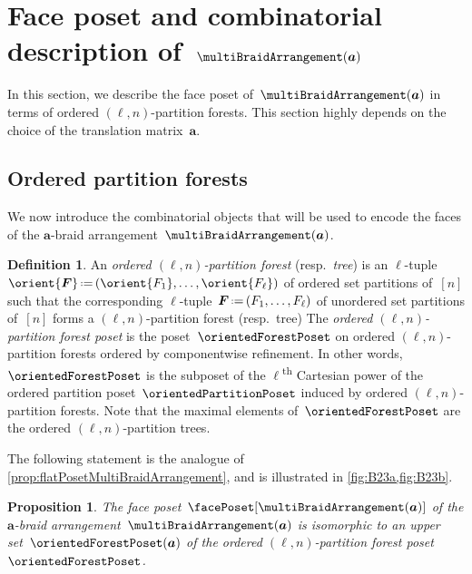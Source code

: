 \documentclass{amsart}
\newcommand{\darkblue}{\color{darkblue}} %
\newtheorem{proposition}[theorem]{Proposition}
\theoremstyle{definition}
\newtheorem{definition}[theorem]{Definition}
\renewcommand{\b}[1]{{\boldsymbol{#1}}} %
\newcommand{\eqdef}{\mbox{\,\raisebox{0.2ex}{\scriptsize\ensuremath{\mathrm:}}\ensuremath{=}\,}} %
\newcommand{\ordinal}{\textsuperscript{th}} %
\newcommand{\defn}[1]{\textsl{\darkblue #1}} %
\renewcommand{\b}[1]{\boldsymbol{#1}} %
\begin{document}

\section{Face poset and combinatorial description of~$\multiBraidArrangement(\b{a})$}
\label{sec:facePoset}

In this section, we describe the face poset of~$\multiBraidArrangement(\b{a})$ in terms of ordered $(\ell,n)$-partition forests.
This section highly depends on the choice of the translation matrix~$\b{a}$.


\subsection{Ordered partition forests}
\label{subsec:orderedPartitionForests}

We now introduce the combinatorial objects that will be used to encode the faces of the $\b{a}$-braid arrangement~$\multiBraidArrangement(\b{a})$.

\begin{definition}
An \defn{ordered $(\ell,n)$-partition forest} (resp.~\defn{tree}) is an $\ell$-tuple~$\orient{\b{F}} \eqdef (\orient{F_1}, \dots, \orient{F_\ell})$ of ordered set partitions of~$[n]$ such that the corresponding $\ell$-tuple~$\b{F} \eqdef (F_1, \dots, F_\ell)$ of unordered set partitions of~$[n]$ forms a $(\ell,n)$-partition forest (resp.~tree)
The \defn{ordered $(\ell,n)$-partition forest poset} is the poset~$\orientedForestPoset$ on ordered $(\ell,n)$-partition forests ordered by componentwise refinement.
In other words, $\orientedForestPoset$ is the subposet of the $\ell$\ordinal{} Cartesian power of the ordered partition poset~$\orientedPartitionPoset$ induced by ordered $(\ell,n)$-partition forests.
Note that the maximal elements of~$\orientedForestPoset$ are the ordered $(\ell, n)$-partition trees.
\end{definition}

The following statement is the analogue of \cref{prop:flatPosetMultiBraidArrangement}, and is illustrated in \cref{fig:B23a,fig:B23b}.

\begin{proposition}
\label{prop:facePosetMultiBraidArrangement}
The face poset~$\facePoset[\multiBraidArrangement(\b{a})]$ of the $\b{a}$-braid arrangement~$\multiBraidArrangement(\b{a})$ is isomorphic to an upper set~$\orientedForestPoset(\b{a})$ of the ordered $(\ell,n)$-partition forest poset~$\orientedForestPoset$.
\end{proposition}
\end{document}
